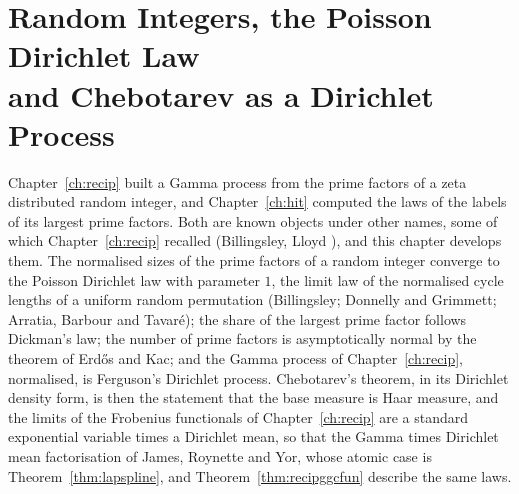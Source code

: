 \chapter[Random Integers and the Poisson Dirichlet Law]{Random Integers, the Poisson Dirichlet Law\\ and Chebotarev as a Dirichlet Process}\label{ch:pd}

Chapter~\ref{ch:recip} built a Gamma process from the prime factors of a zeta distributed random integer, and Chapter~\ref{ch:hit} computed the laws of the labels of its largest prime factors. Both are known objects under other names, some of which Chapter~\ref{ch:recip} recalled (Billingsley, Lloyd \cite{lloyd1984}), and this chapter develops them. The normalised sizes of the prime factors of a random integer converge to the Poisson Dirichlet law with parameter $1$, the limit law of the normalised cycle lengths of a uniform random permutation (Billingsley; Donnelly and Grimmett; Arratia, Barbour and Tavar\'e); the share of the largest prime factor follows Dickman's law; the number of prime factors is asymptotically normal by the theorem of Erd\H{o}s and Kac; and the Gamma process of Chapter~\ref{ch:recip}, normalised, is Ferguson's Dirichlet process. Chebotarev's theorem, in its Dirichlet density form, is then the statement that the base measure is Haar measure, and the limits of the Frobenius functionals of Chapter~\ref{ch:recip} are a standard exponential variable times a Dirichlet mean, so that the Gamma times Dirichlet mean factorisation of James, Roynette and Yor, whose atomic case is Theorem~\ref{thm:lapspline}, and Theorem~\ref{thm:recipggcfun} describe the same laws.

